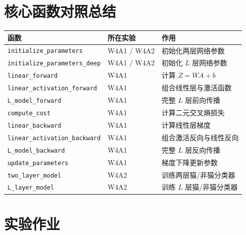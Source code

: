 \documentclass{../../nndlcourse}
\begin{document}
\section{核心函数对照总结}

\begin{center}
\begin{tabular}{|l|l|l|}
\hline
\textbf{函数} & \textbf{所在实验} & \textbf{作用} \\
\hline
\texttt{initialize\_parameters} & W4A1 / W4A2 & 初始化两层网络参数 \\
\texttt{initialize\_parameters\_deep} & W4A1 / W4A2 & 初始化 $L$ 层网络参数 \\
\texttt{linear\_forward} & W4A1 & 计算 $Z=WA+b$ \\
\texttt{linear\_activation\_forward} & W4A1 & 组合线性层与激活函数 \\
\texttt{L\_model\_forward} & W4A1 & 完整 $L$ 层前向传播 \\
\texttt{compute\_cost} & W4A1 & 计算二元交叉熵损失 \\
\texttt{linear\_backward} & W4A1 & 计算线性层梯度 \\
\texttt{linear\_activation\_backward} & W4A1 & 组合激活反向与线性反向 \\
\texttt{L\_model\_backward} & W4A1 & 完整 $L$ 层反向传播 \\
\texttt{update\_parameters} & W4A1 & 梯度下降更新参数 \\
\texttt{two\_layer\_model} & W4A2 & 训练两层猫/非猫分类器 \\
\texttt{L\_layer\_model} & W4A2 & 训练 $L$ 层猫/非猫分类器 \\
\hline
\end{tabular}
\end{center}


\section{实验作业}
\end{document}
